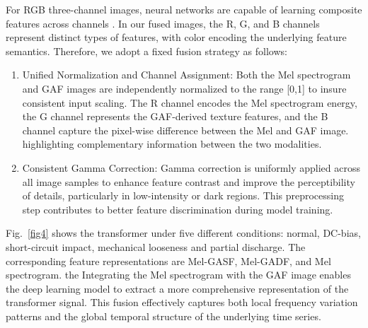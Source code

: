 \documentclass[final,5p,times,twocolumn]{elsarticle}
\begin{document}
For RGB three-channel images, neural networks are capable of learning composite features across channels \cite{9673131}. In our fused images, the R, G, and B channels represent distinct types of features, with color encoding the underlying feature semantics. Therefore, we adopt a fixed fusion strategy as follows:

\begin{enumerate}
	\item{Unified Normalization and Channel Assignment: Both the Mel spectrogram and GAF images are independently normalized to the range [0,1] to insure consistent input scaling. The R channel encodes the Mel spectrogram energy, the G channel represents the GAF-derived texture features, and the B channel capture the pixel-wise difference between the Mel and GAF image. highlighting complementary information between the two modalities.}
	\item{Consistent Gamma Correction: Gamma correction is uniformly applied across all image samples to enhance feature contrast and improve the perceptibility of details, particularly in low-intensity or dark regions. This preprocessing step contributes to better feature discrimination during model training.}
\end{enumerate}

Fig.~\ref{fig4} shows the transformer under five different conditions: normal, DC-bias, short-circuit impact, mechanical looseness and partial discharge. The corresponding feature representations are Mel-GASF, Mel-GADF, and Mel spectrogram. the Integrating the Mel spectrogram with the GAF image enables the deep learning model to extract a more comprehensive representation of the transformer signal. This fusion effectively captures both local frequency variation patterns and the global temporal structure of the underlying time series.
\end{document}
